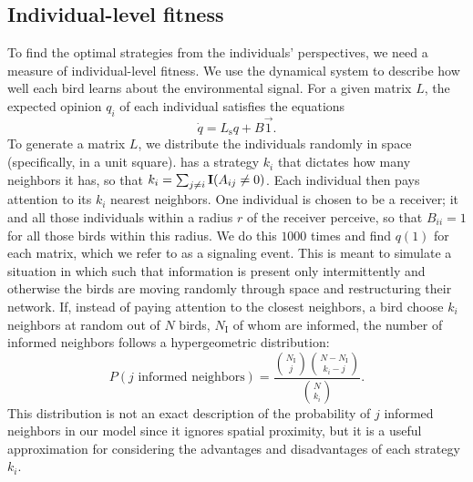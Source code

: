 \documentclass{article}
\begin{document}
\subsection{Individual-level fitness }
To find the optimal strategies from the individuals' perspectives, we need a measure of individual-level fitness. We use the dynamical system to describe how well each bird learns about the environmental signal. For a given matrix $L$, the expected opinion $q_i$ of each individual satisfies the equations
\begin{equation}
\dot{q}=L_\text{s}q+B\vec{1}. \label{expected_opinion}
\end{equation}
To generate a matrix $L$, we distribute the individuals randomly in space (specifically, in a unit square). has a strategy $k_i$ that dictates how many neighbors it has, so that $k_i=\sum_{j\neq i}{\bf I}(A_{ij}\neq 0)$.    Each individual then pays attention to its $k_i$ nearest neighbors.  One individual is chosen to be a receiver; it and all those individuals within a radius $r$ of the receiver perceive, so that $B_{ii}=1$ for all those birds within this radius. We do this $1000$ times and find $q(1)$ for each matrix, which we refer to as a signaling event. This is meant to simulate a situation in which such that information is present only intermittently and otherwise the birds are moving randomly through space and restructuring their network.  If, instead of paying attention to the closest neighbors, a bird choose $k_i$ neighbors at random out of $N$ birds, $N_\text{I}$ of whom are informed, the number of informed neighbors follows a hypergeometric distribution:
\begin{equation}
P(j \text{ informed neighbors} )=\frac{{N_\text{I}\choose j}{N-N_\text{I}\choose k_i-j}  }{{N\choose k_i}}. \label{hypergeom}
\end{equation} 
This distribution is not an exact description of the probability of $j$ informed neighbors in our model  since it ignores spatial proximity, but it is a useful approximation for considering the advantages and disadvantages of each strategy $k_i$.
\end{document}
